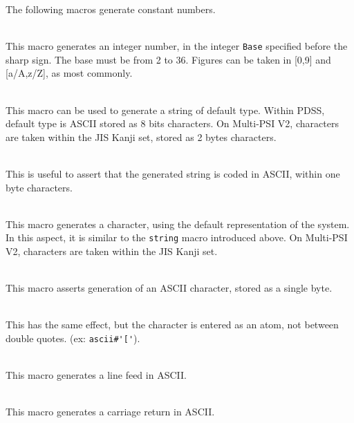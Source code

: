 The following macros generate constant numbers. \index{\verb|#|}
\begin{itemize}

\\
This macro generates an integer number, in the integer \verb|Base|
specified before the sharp sign.
The base must be from 2 to 36. Figures can be taken in
[0,9] and [a/A,z/Z], as most commonly.

\\
This macro can be used to generate a string of default type.
Within PDSS, default type is ASCII stored as 8 bits characters.
On Multi-PSI V2, characters are taken within the JIS Kanji set,
stored as 2 bytes characters.

\\
This is useful to assert that the generated string is coded in ASCII, within
one byte characters.

\\
This macro generates a character, using the default representation of
the system. In this aspect, it is similar to the \verb|string| macro
introduced above. On Multi-PSI V2, characters are taken within
the JIS Kanji set.

\\
This macro asserts generation of an ASCII character, stored as a single byte.

\\
This has the same effect, but the character is entered as an atom,
not between double quotes. (ex: \verb|ascii#'['|).

\\
This macro generates a line feed in ASCII.

\\
This macro generates a carriage return in ASCII.

\end{itemize}
